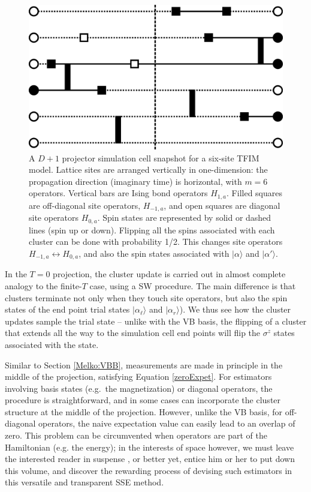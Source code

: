 \documentclass[vecphys]{svmult}
\begin{document}
\begin{figure}[t]
\centering
\includegraphics*[width=.85\textwidth]{zeroT_tfim.eps}
\caption[]{A $D+1$ projector simulation cell snapshot for a six-site TFIM model.  Lattice sites are arranged vertically in one-dimension: the propagation direction (imaginary time) is horizontal, with $m=6$ operators.  
Vertical bars are Ising bond operators $H_{1,a}$.  Filled squares are off-diagonal site operators, $H_{-1,a}$, and open squares are diagonal site operators $H_{0,a}$.
Spin states are represented by solid or dashed lines (spin up or down).  Flipping all the spins associated with each cluster can be done with probability 1/2.  This changes site operators $H_{-1,a} \leftrightarrow H_{0,a}$, and also the spin states associated with  $|\alpha \rangle$ and $|\alpha' \rangle$.}
\label{fig:5}      
\end{figure} 

In the $T=0$ projection, the cluster update is carried out in almost complete analogy to the finite-$T$ case, using a SW procedure.  The main difference is that clusters terminate not only when they touch site operators, but also the spin states of the end point trial states $|\alpha_{\ell} \rangle$ and $|\alpha_r \rangle$).  We thus see how the cluster updates sample the trial state -- unlike with the VB basis, the flipping of a cluster that extends all the way to the simulation cell end points will flip the $\sigma^z$ states associated with the state. 

Similar to Section \ref{Melko:VBB}, measurements are made in principle in the middle of the projection, satisfying Equation \ref{zeroExpet}.  
For estimators involving basis states (e.g.~the magnetization) or diagonal operators, the procedure is straightforward, and in some cases can incorporate the cluster structure at the middle of the projection.
However, unlike the VB basis, for off-diagonal operators, the naive expectation value can easily lead to an overlap of zero.  This problem can be circumvented when operators are part of the Hamiltonian (e.g. the energy); in the interests of space however, we must leave the interested reader in suspense \cite{Melko:unpub}, or better yet, entice him or her to put down this volume, and discover the rewarding process of devising such estimators in this versatile and transparent SSE method.
\end{document}
